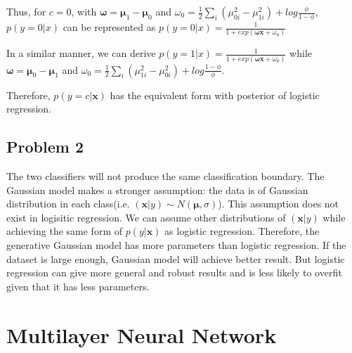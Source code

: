 \documentclass[10pt]{article}
\begin{document}
Thus, for $c=0$, with $\boldsymbol\omega=\boldsymbol\mu_1-\boldsymbol\mu_0$ and $\omega_{0}=\frac{1}{2}\displaystyle\sum_{i}(\mu_{0i}^{2}-\mu_{1i}^{2})+log\frac{\phi}{1-\phi}$, $p(y=0|x)$ can be represented as $p(y=0|x)=\frac{1}{1+exp(\boldsymbol\omega \mathbf{x}+\omega_0)}$

In a similar manner, we can derive $p(y=1|x)=\frac{1}{1+exp(\boldsymbol\omega \mathbf{x}+\omega_0)}$ while $\boldsymbol\omega=\boldsymbol\mu_0-\boldsymbol\mu_1$ and $\omega_{0}=\frac{1}{2}\displaystyle\sum_{i}(\mu_{1i}^{2}-\mu_{0i}^{2})+log\frac{1-\phi}{\phi}$.

Therefore, $p(y=c|\mathbf{x})$ has the equivalent form with posterior of logistic regression.

\subsection{Problem 2}

The two classifiers will not produce the same classification boundary. The Gaussian model makes a stronger assumption: the data is of Gaussian distribution in each class(i.e. $(\mathbf{x}|y) \sim N(\boldsymbol\mu, \sigma)$). This assumption does not exist in logisitic regression. We can assume other distributions of $(\mathbf{x}|y)$ while achieving the same form of $p(y|\mathbf{x})$ as logistic regression. Therefore, the generative Gaussian model has more parameters than logistic regression. If the dataset is large enough, Gaussian model will achieve better result. But logistic regression can give more general and robust results and is less likely to overfit given that it has less parameters. 

\section{Multilayer Neural Network}
\end{document}
